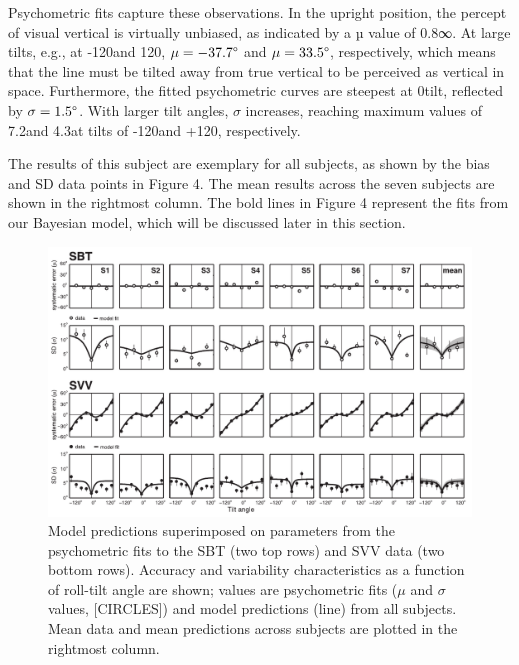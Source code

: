 Psychometric fits capture these observations. In the upright position, the percept of visual vertical is virtually unbiased, as indicated by a µ value of 0.8∞. At large tilts, e.g., at -120\textdegree and 120\textdegree, $\mu = -37.7\degree$ and $\mu = 33.5\degree$, respectively, which means that the line must be tilted away from true vertical to be perceived as vertical in space. Furthermore, the fitted psychometric curves are steepest at 0\textdegree tilt, reflected by $\sigma = 1.5\degree$. With larger tilt angles, $\sigma$ increases, reaching maximum values of 7.2\textdegree and 4.3\textdegree at tilts of -120\textdegree and +120\textdegree, respectively. 

The results of this subject are exemplary for all subjects, as shown by the bias and SD data points in Figure 4. The mean results across the seven subjects are shown in the rightmost column. The bold lines in Figure 4 represent the fits from our Bayesian model, which will be discussed later in this section. 

\begin{figure}
	\includegraphics[width=1.0\textwidth]{src/paper1/figure4.pdf}
	
    \caption{Model predictions superimposed on parameters from the psychometric fits to the SBT (two top rows) and SVV data (two bottom rows). Accuracy and variability characteristics as a function of roll-tilt angle are shown; values are psychometric fits ($\mu$ and $\sigma$ values, [CIRCLES]) and model predictions (line) from all subjects. Mean data and mean predictions across subjects are plotted in the rightmost column.}
\end{figure}

